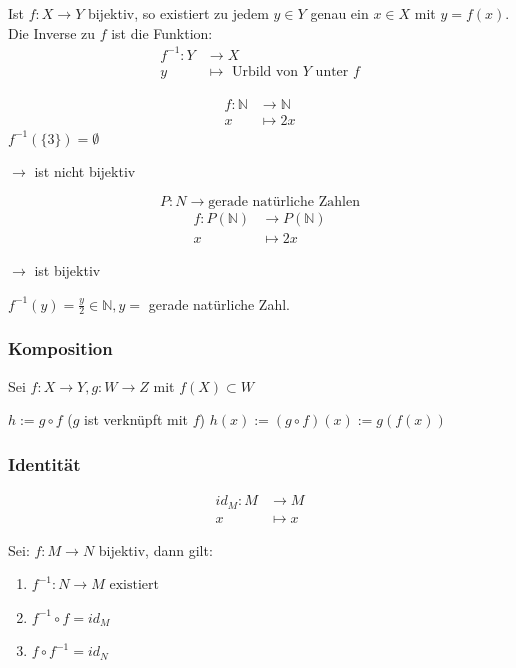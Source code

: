 \documentclass[fleqn]{scrartcl}
\newenvironment{example}{{\bfseries Beispiel }}{}
\begin{document}
Ist $f : X \to Y$ bijektiv, so existiert zu jedem $y \in Y$ genau ein $x \in X$ mit $y =f(x)$. Die Inverse zu $f$ ist die Funktion: 
\begin{align*}
  f^{-1} : Y &\to X\\
  y &\mapsto \text{ Urbild von } Y \text{ unter } f
\end{align*}

\begin{example}
\begin{align*}
  f : \mathbb{N} & \to     \mathbb{N}\\
                    x & \mapsto 2x
\end{align*}
$ f^{-1}(\{3\}) = \emptyset $

$\rightarrow$ ist nicht bijektiv

\[P : N \to \text{gerade natürliche Zahlen}\]
\begin{align*}
  f : P(\mathbb{N}) & \to     P(\mathbb{N})\\
                       x & \mapsto 2x
\end{align*}
\end{example}

$\rightarrow$ ist bijektiv

$f^{-1}(y)=\frac{y}{2} \in \mathbb{N},y=$ gerade natürliche Zahl.

\subsubsection{Komposition}

Sei $f : X \to Y, g : W \to Z$ mit $f(X) \subset W$

$h:= g \circ f$ ($g$ ist verknüpft mit $f$)
$h(x):= (g \circ f)(x):=g(f(x))$

\subsubsection{Identität}

\begin{align*}
  id_M : M & \to     M\\
              x & \mapsto x
\end{align*}

Sei: $f : M \to N$ bijektiv, dann gilt:

\begin{enumerate}
 \item $f^{-1} : N \to M \text{ existiert} $
 \item $f^{-1} \circ f = id_M$
 \item $f \circ f^{-1} = id_N$
\end{enumerate}
\end{document}
